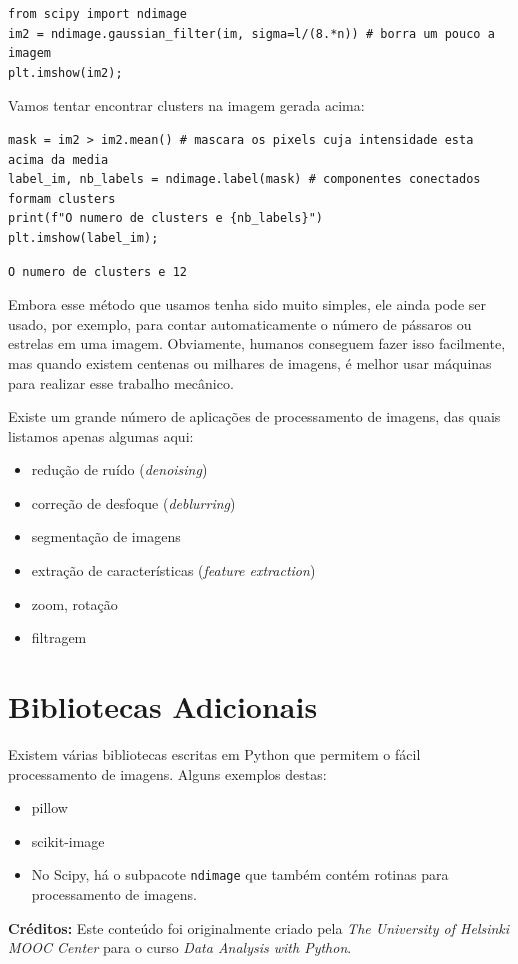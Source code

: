 \documentclass[11pt,a4paper]{article}
\begin{document}
\begin{lstlisting}
from scipy import ndimage
im2 = ndimage.gaussian_filter(im, sigma=l/(8.*n)) # borra um pouco a imagem
plt.imshow(im2);
\end{lstlisting}

Vamos tentar encontrar clusters na imagem gerada acima:
\begin{lstlisting}
mask = im2 > im2.mean() # mascara os pixels cuja intensidade esta acima da media
label_im, nb_labels = ndimage.label(mask) # componentes conectados formam clusters
print(f"O numero de clusters e {nb_labels}")
plt.imshow(label_im);
\end{lstlisting}
\begin{verbatim}
O numero de clusters e 12
\end{verbatim}

Embora esse método que usamos tenha sido muito simples, ele ainda pode ser usado, por exemplo, para contar automaticamente o número de pássaros ou estrelas em uma imagem. Obviamente, humanos conseguem fazer isso facilmente, mas quando existem centenas ou milhares de imagens, é melhor usar máquinas para realizar esse trabalho mecânico.

Existe um grande número de aplicações de processamento de imagens, das quais listamos apenas algumas aqui:
\begin{itemize}
    \item redução de ruído (\textit{denoising})
    \item correção de desfoque (\textit{deblurring})
    \item segmentação de imagens
    \item extração de características (\textit{feature extraction})
    \item zoom, rotação
    \item filtragem
\end{itemize}

\section{Bibliotecas Adicionais}
Existem várias bibliotecas escritas em Python que permitem o fácil processamento de imagens. Alguns exemplos destas:
\begin{itemize}
    \item pillow
    \item scikit-image
    \item No Scipy, há o subpacote \texttt{ndimage} que também contém rotinas para processamento de imagens.
\end{itemize}

\vspace{2em}
\noindent\textbf{Créditos:} Este conteúdo foi originalmente criado pela \textit{The University of Helsinki MOOC Center} para o curso \textit{Data Analysis with Python}.
\end{document}
